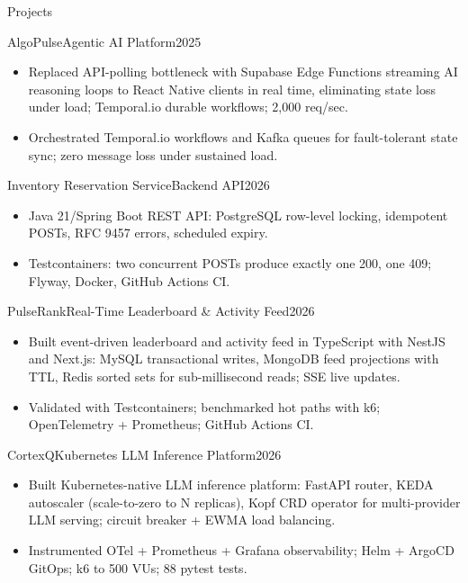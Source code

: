 \documentclass[]{mcdowellcv}
\begin{document}
\begin{cvsection}{Projects}
  \begin{cvsubsection}{AlgoPulse}{Agentic AI Platform}{2025}
    \begin{itemize}
      \item Replaced API-polling bottleneck with Supabase Edge Functions streaming AI reasoning loops to React Native clients in real time, eliminating state loss under load; Temporal.io durable workflows; 2,000 req/sec.
      \item Orchestrated Temporal.io workflows and Kafka queues for fault-tolerant state sync; zero message loss under sustained load.
    \end{itemize}
    \vspace{-1.5pt}
  \end{cvsubsection}

  \begin{cvsubsection}{Inventory Reservation Service}{Backend API}{2026}
    \begin{itemize}
      \item Java 21/Spring Boot REST API: PostgreSQL row-level locking, idempotent POSTs, RFC 9457 errors, scheduled expiry.
      \item Testcontainers: two concurrent POSTs produce exactly one 200, one 409; Flyway, Docker, GitHub Actions CI.
    \end{itemize}
    \vspace{-1.5pt}
  \end{cvsubsection}

  \begin{cvsubsection}{PulseRank}{Real-Time Leaderboard \& Activity Feed}{2026}
    \begin{itemize}
      \item Built event-driven leaderboard and activity feed in TypeScript with NestJS and Next.js: MySQL transactional writes, MongoDB feed projections with TTL, Redis sorted sets for sub-millisecond reads; SSE live updates.
      \item Validated with Testcontainers; benchmarked hot paths with k6; OpenTelemetry + Prometheus; GitHub Actions CI.
    \end{itemize}
    \vspace{-1.5pt}
  \end{cvsubsection}

  \begin{cvsubsection}{CortexQ}{Kubernetes LLM Inference Platform}{2026}
    \begin{itemize}
      \item Built Kubernetes-native LLM inference platform: FastAPI router, KEDA autoscaler (scale-to-zero to N replicas), Kopf CRD operator for multi-provider LLM serving; circuit breaker + EWMA load balancing.
      \item Instrumented OTel + Prometheus + Grafana observability; Helm + ArgoCD GitOps; k6 to 500 VUs; 88 pytest tests.
    \end{itemize}
  \end{cvsubsection}
\end{cvsection}
\end{document}
